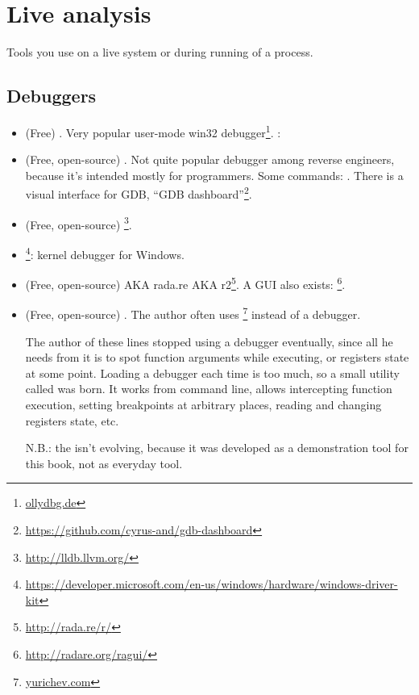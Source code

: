 \section{Live analysis}

Tools you use on a live system or during running of a process.

\subsection{Debuggers}

\myindex{\olly}

\begin{itemize}
\item (Free) .
Very popular user-mode win32 debugger\footnote{\href{http://go.yurichev.com/17032}{ollydbg.de}}.
\ShortHotKeyCheatsheet: 

\item (Free, open-source) .
Not quite popular debugger among reverse engineers, because it's intended mostly for programmers.
Some commands: .
There is a visual interface for GDB, ``GDB dashboard''\footnote{\url{https://github.com/cyrus-and/gdb-dashboard}}.

\item (Free, open-source) \footnote{\url{http://lldb.llvm.org/}}.

\item {}\footnote{\url{https://developer.microsoft.com/en-us/windows/hardware/windows-driver-kit}}:
kernel debugger for Windows.

\item (Free, open-source)  \ac{AKA} rada.re \ac{AKA} r2\footnote{\url{http://rada.re/r/}}.
A GUI also exists: \footnote{\url{http://radare.org/ragui/}}.

\item (Free, open-source) .
\label{tracer}
The author often uses 
\footnote{\href{http://go.yurichev.com/17338}{yurichev.com}}
instead of a debugger.

The author of these lines stopped using a debugger eventually, since all he needs from it is to spot function arguments while
executing, or registers state at some point.
Loading a debugger each time is too much, so a small utility called  was born.
It works from command line, allows intercepting function execution,
setting breakpoints at arbitrary places, reading and changing registers state, etc.

N.B.: the  isn't evolving, because it was developed as a demonstration tool for this book, not as everyday tool.
\end{itemize}

